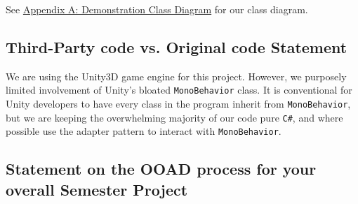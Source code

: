 \documentclass[11pt]{amsart}
\begin{document}




See \hyperref[sec:appendixa]{Appendix A: Demonstration Class Diagram} for our class diagram.

\subsection*{Third-Party code vs. Original code Statement} \phantom{}

We are using the Unity3D game engine for this project. However, we purposely limited involvement of Unity's bloated \texttt{MonoBehavior} class. It is conventional for Unity developers to have every class in the program inherit from \texttt{MonoBehavior}, but we are keeping the overwhelming majority of our code pure \texttt{C\#}, and where possible use the adapter pattern to interact with \texttt{MonoBehavior}. 

\subsection*{Statement on the OOAD process for your overall Semester Project} \phantom{}
\end{document}
